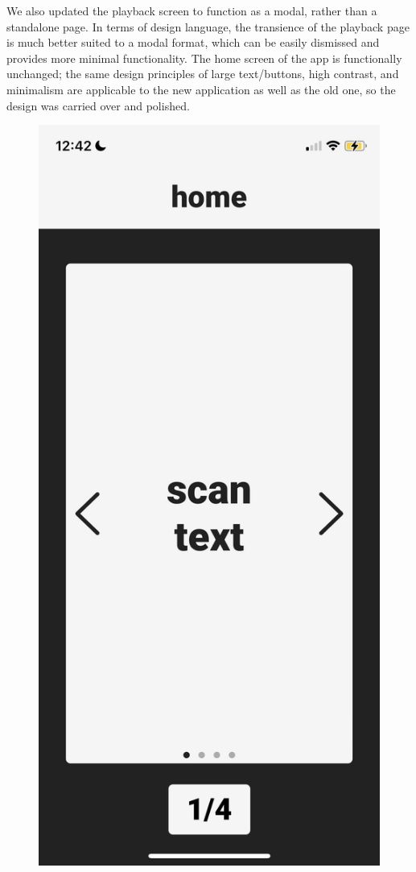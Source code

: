 \documentclass[a4paper,11pt]{article}
\begin{document}
We also updated the playback screen to function as a modal, rather than a standalone page. In terms of design language, the transience of the playback page is much better suited to a modal format, which can be easily dismissed and provides more minimal functionality. The home screen of the app is functionally unchanged; the same design principles of large text/buttons, high contrast, and minimalism are applicable to the new application as well as the old one, so the design was carried over and polished.

\begin{figure}[H]
\centering
\includegraphics[scale=0.2]{img/app/landing.png}

\end{figure}
\end{document}

